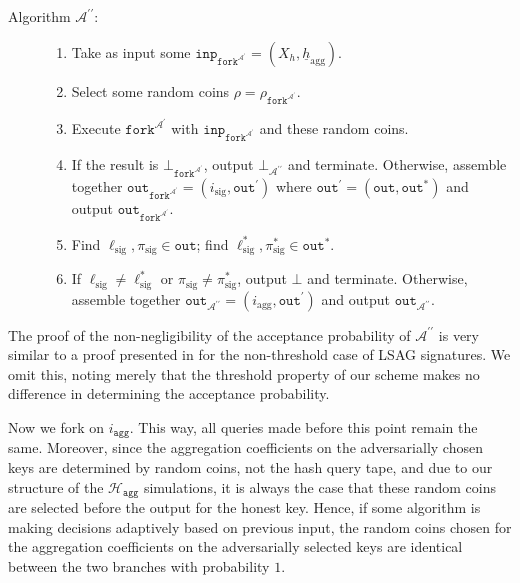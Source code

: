\documentclass{iacrtrans}
\theoremstyle{definition}
\numberwithin{theorem}{subsection}
\numberwithin{lemma}{theorem}
\newcommand{\adversary}{\mathcal{A}}
\begin{document}
\begin{description}
\item [Algorithm $\adversary^{\prime \prime}$: ] 

\begin{enumerate}
\item Take as input some $\texttt{inp}_{\texttt{fork}^{\adversary^\prime}} = (X_h, \underline{h}_{\text{agg}})$. 

\item Select some random coins $\rho = \rho_{\texttt{fork}^{\adversary^\prime}}$. 

\item Execute $\texttt{fork}^{\adversary^\prime}$ with $\texttt{inp}_{\texttt{fork}^{\adversary^\prime}}$ and these random coins. 

\item If the result is $\bot_{\texttt{fork}^{\adversary^\prime}}$, output $\bot_{\adversary^{\prime \prime}}$ and terminate. Otherwise, assemble together $\texttt{out}_{\texttt{fork}^{\adversary^\prime}} = (i_{\text{sig}}, \texttt{out}^{\prime})$ where $\texttt{out}^{\prime} = (\texttt{out}, \texttt{out}^*)$ and output $\texttt{out}_{\texttt{fork}^{\adversary^\prime}}$. 

\item Find $\ell_{\text{sig}}, \pi_{\text{sig}} \in \texttt{out}$; find $\ell_{\text{sig}}^*, \pi^*_{\text{sig}} \in \texttt{out}^*$.

\item If $\ell_{\text{sig}} \neq \ell_{\text{sig}}^*$ or $\pi_{\text{sig}} \neq \pi_{\text{sig}}^*$, output $\bot$ and terminate. Otherwise, assemble together $\texttt{out}_{\adversary^{\prime \prime}} = (i_{\text{agg}}, \texttt{out}^{\prime})$ and output $\texttt{out}_{\adversary^{\prime\prime}}$.
\end{enumerate}
\end{description}

The proof of the non-negligibility of the acceptance probability of $\adversary^{\prime \prime}$ is very similar to a proof presented in \cite{liu2004linkable} for the non-threshold case of LSAG signatures. We omit this, noting merely that the threshold property of our scheme makes no difference in determining the acceptance probability. 

Now we fork on $i_{\texttt{agg}}$. This way, all queries made before this point remain the same. Moreover, since the aggregation coefficients on the adversarially chosen keys are determined by random coins, not the hash query tape, and due to our structure of the $\mathcal{H}_{\texttt{agg}}$ simulations, it is always the case that these random coins are selected before the output for the honest key. Hence, if some algorithm is making decisions adaptively based on previous input, the random coins chosen for the aggregation coefficients on the adversarially selected keys are identical between the two branches with probability $1$.
\end{document}
